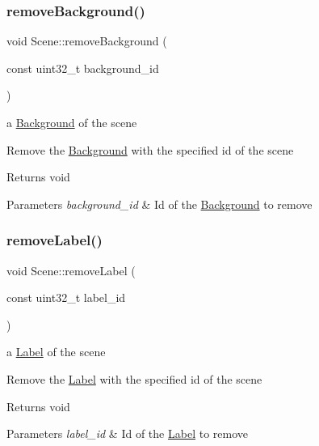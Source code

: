 \subsubsection{\texorpdfstring{remove\+Background()}{removeBackground()}}
{\footnotesize\ttfamily void Scene\+::remove\+Background (\begin{DoxyParamCaption}\item[{const uint32\+\_\+t}]{background\+\_\+id }\end{DoxyParamCaption})}

a \hyperlink{class_background}{Background} of the scene

Remove the \hyperlink{class_background}{Background} with the specified id of the scene

\begin{DoxyReturn}{Returns}
void 
\end{DoxyReturn}

\begin{DoxyParams}{Parameters}
{\em background\+\_\+id} & Id of the \hyperlink{class_background}{Background} to remove \\
\hline
\end{DoxyParams}
\mbox{\label{class_scene_ac8e9f99810684c6bd397477972691cb8}} 
\subsubsection{\texorpdfstring{remove\+Label()}{removeLabel()}}
{\footnotesize\ttfamily void Scene\+::remove\+Label (\begin{DoxyParamCaption}\item[{const uint32\+\_\+t}]{label\+\_\+id }\end{DoxyParamCaption})}

a \hyperlink{class_label}{Label} of the scene

Remove the \hyperlink{class_label}{Label} with the specified id of the scene

\begin{DoxyReturn}{Returns}
void 
\end{DoxyReturn}

\begin{DoxyParams}{Parameters}
{\em label\+\_\+id} & Id of the \hyperlink{class_label}{Label} to remove \\
\hline
\end{DoxyParams}
\mbox{\label{class_scene_a1e0fa3c3898c30822e14fdaa963eaa62}} 
